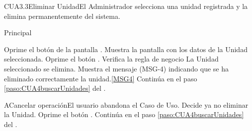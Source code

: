 	\begin{UseCase}{CUA3.3}{Eliminar Unidad}{El Administrador selecciona una unidad registrada y la elimina permanentemente del sistema.}
	\end{UseCase}

	\begin{UCtrayectoria}{Principal}
 			
			\UCpaso[\UCactor] Oprime el botón  de la pantalla .
			\UCpaso Muestra la pantalla  con los datos de la Unidad seleccionada.\label{paso:CUA4.3muestraUnidad}
			\UCpaso [\UCactor] Oprime el botón . 
			\UCpaso Verifica la regla de negocio 
			\UCpaso La Unidad seleccionado se elimina.
			\UCpaso Muestra el mensaje (MSG-4) indicando que se ha eliminado correctamente la unidad.\ref{MSG4}
			\UCpaso Continúa en el paso \ref{paso:CUA4buscarUnidades} del .
	\end{UCtrayectoria}

		
		\begin{UCtrayectoriaA}{A}{Cancelar operación}{El usuario abandona el Caso de Uso.}
			\UCpaso[\UCactor] Decide ya no eliminar la Unidad. \label{Datos_Asoc_Equipo}
			\UCpaso[\UCactor] Oprime el botón .
			\UCpaso Continúa en el paso \ref{paso:CUA4buscarUnidades} del .
		\end{UCtrayectoriaA}
	
